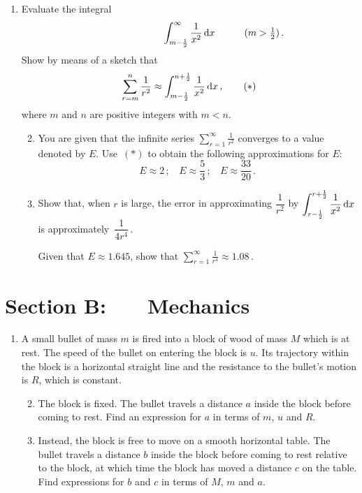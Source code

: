 \documentclass[a4, 11pt]{report}
\newlength{\qspace}
\newcounter{qnumber}
\newenvironment{question}%
 {\vspace{\qspace}
  \begin{enumerate}[\bfseries 1\quad][10]%
    \setcounter{enumi}{\value{qnumber}}%
    \item%
 }
{
  \end{enumerate}
  \filbreak
  \stepcounter{qnumber}
 }
\newenvironment{questionparts}[1][1]%
 {
  \begin{enumerate}[\bfseries (i)]%
    \setcounter{enumii}{#1}
    \addtocounter{enumii}{-1}
    \setlength{\itemsep}{5mm}
    \setlength{\parskip}{8pt}
 }
 {
  \end{enumerate}
 }
\def\d{{\rm d}}
\begin{document}
\begin{question}
Evaluate  the integral
\[
\hphantom{ \ \ \ \ \ \ \ \ \ 
(m> \tfrac12)\,.}
\int_{m-\frac12} ^\infty \frac 1{x^2}\,  \d x 
{ \ \ \ \ \ \ \ \ \ 
(m> \tfrac12)\,.}
\]
Show by means 
of a sketch that 
\[
\sum_{r=m}^n \frac 1 {r^2} 
\approx \int_{m-\frac12}^{n+\frac12} \frac1 {x^2} \, \d x
\,,
\tag{$*$}
\]
where $m$ and $n$ are positive integers with $m<n$.

\begin{questionparts}
\item You are given that the infinite series $\displaystyle
\sum_{r=1}^\infty \frac 1 {r^2}$
converges to a value denoted by $E$.
Use~$(*)$ to obtain the following approximations for $E$:
\[
E\approx 2\,; \ \ \ \
E\approx \frac53\,; \ \ \ \
E\approx \frac{33}{20}
\,.\]
\item Show that, when $r$ is large,  the error 
in approximating 
$\dfrac 1{r^2}$ 
 by 
$\displaystyle \int_{r-\frac12}^{r+\frac12} \frac 1 {x^2} \, \d x$
  is approximately~$\dfrac 1{4r^4}\,$.

Given that $E \approx 1.645$, show that 
$\displaystyle \sum_{r=1}^\infty \frac1{r^4} \approx 1.08\, $.  

\end{questionparts}

\end{question}


\newpage
\section*{Section B: \ \ \ Mechanics}
\begin{question}
A small bullet of mass $m$ is fired into a block of wood of mass $M$ which is
at rest. 
The speed
of the bullet on entering the block is $u$.  Its trajectory 
within the block is a horizontal
straight line and  the resistance to the 
bullet's motion is $R$, which is constant.

\begin{questionparts}
\item The block is fixed. The bullet travels a distance
$a$ inside the block before coming to rest.
Find an expression for $a$ in terms of $m$, $u$ and $R$.

\item Instead, the block is free to move on a smooth horizontal 
table. The bullet travels a distance $b$ inside the block
before coming to rest relative to the block, at which time the 
block has moved a distance $c$ on the table. 
Find expressions for $b$ and $c$ in terms of $M$, $m$ and $a$.
 \end{questionparts} 

\end{question}
\end{document}
